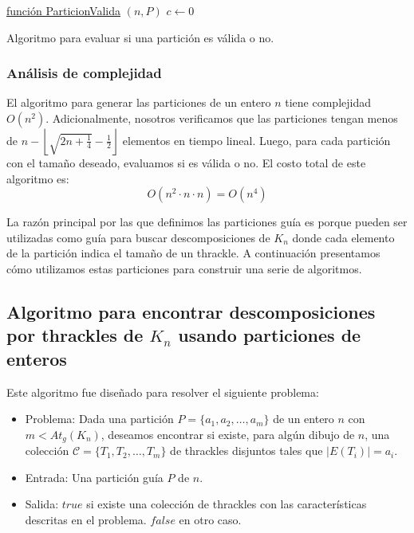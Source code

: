     \begin{algorithm}[htpb]
      \DontPrintSemicolon
      \underline{función ParticionValida} $(n,P)$\;
        $c \gets 0$\;
       \caption{Algoritmo para evaluar si una partición es válida o no.}
       \label{algo:is_partition_valid}
    \end{algorithm}
    \subsubsection{Análisis de complejidad}

    El algoritmo para generar las particiones de un entero $n$ tiene complejidad
    $O(n^2)$. Adicionalmente, nosotros verificamos que las particiones  tengan
    menos de $n - \left\lfloor\sqrt{2n + \frac{1}{4}} - \frac{1}{2}\right\rfloor$
    elementos en tiempo lineal. Luego, para cada partición con el tamaño deseado,
    evaluamos si es válida o no. El costo total de este algoritmo es:
    \[ O(n^2\cdot n \cdot n) = O(n^4)\]

    La razón principal por las que definimos las particiones guía es porque pueden ser utilizadas
    como guía para buscar descomposiciones de $K_n$ donde cada elemento de la partición indica
    el tamaño de un thrackle. A continuación presentamos cómo utilizamos estas particiones
    para construir una serie de algoritmos.

\subsection{Algoritmo para encontrar descomposiciones por thrackles de $K_n$
usando particiones de enteros}\label{secc:descomposiciones_particiones}

  Este algoritmo fue diseñado para resolver el siguiente problema:
  \begin{itemize}
    \item[] Problema: Dada una partición $P=\{a_1,a_2,\dots,a_m\}$ de un entero $n$ con
    $m < At_g(K_n)$, deseamos encontrar si existe, para algún dibujo de $n$, una colección
    $\mathcal{C}=\{T_1,T_2,\dots,T_m\}$ de thrackles disjuntos tales que $|E(T_i)| = a_i$.
    \item[] Entrada: Una partición guía $P$ de $n$.
    \item[] Salida: $true$ si existe una colección de thrackles con las características
    descritas en el problema. $false$ en otro caso.
  \end{itemize}

